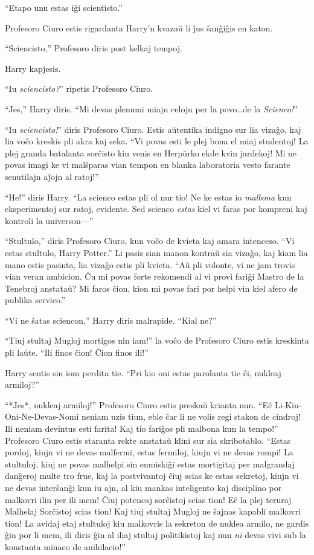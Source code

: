 ``Etapo unu estas iĝi scientisto.''

Profesoro Ciuro estis rigardanta Harry'n kvazaŭ li ĵus ŝanĝiĝis en katon.

``Sciencisto,'' Profesoro diris post kelkaj tempoj.

Harry kapjesis.

``Iu \emph{sciencisto?}'' ripetis Profesoro Ciuro.

``Jes,'' Harry diris. ``Mi devas plenumi miajn celojn per la
povo\ldots de la \emph{Scienco!}''

``Iu \emph{sciencisto!}'' diris Profesoro Ciuro. Estis aŭtentika
indigno sur lia vizaĝo, kaj lia voĉo kreskis pli akra kaj seka. ``Vi
povas esti le plej bona el miaj studentoj! La plej granda batalanta
sorĉisto kiu venis en Herpŭrko ekde kvin jardekoj! Mi ne povas imagi
ke vi malŝparas vian tempon en blanka laboratoria vesto farante
senutilajn aĵojn al ratoj!''

``He!'' diris Harry. ``La scienco estas pli ol nur tio! Ne ke estas io
\emph{malbona} kun eksperimentoj sur ratoj, evidente. Sed scienco
\emph{estas} kiel vi faras por kompreni kaj kontroli la universon—''

``Stultulo,'' diris Profesoro Ciuro, kun voĉo de kvieta kaj amara
intenceso. ``Vi estas stultulo, Harry Potter.'' Li pasis sian manon
kontraŭ sia vizaĝo, kaj kiam lia mano estis pasinta, lia vizaĝo estis
pli kvieta. ``Aŭ pli volonte, vi ne jam trovis vian veran ambicion. Ĉu
mi povas forte rekomendi al vi provi fariĝi Mastro de la Tenebroj
anstataŭ? Mi faros ĉion, kion mi povas fari por helpi vin kiel afero
de publika servico.''

``Vi ne ŝatas sciencon,'' Harry diris malrapide. ``Kial ne?''

``Tiuj stultaj Mugloj mortigos nin iam!'' la voĉo de Profesoro Ciuro
estis kreskinta pli laŭte. ``Ili finos ĉion! Ĉion finos ili!''

Harry sentis sin iom perdita tie. ``Pri kio oni estas parolanta tie ĉi, nukleaj armiloj?''

``*Jes*, nukleaj armiloj!'' Profesoro Ciuro estis preskaŭ krianta
nun. ``Eĉ Li-Kiu-Oni-Ne-Devas-Nomi neniam uzis tiun, eble ĉar li ne
volis regi stakon de cindroj! Ili neniam devintus esti farita! Kaj tio
fariĝos pli malbona kun la tempo!'' Profesoro Ciuro estis staranta
rekte anstataŭ klini sur sia skribotablo. ``Estas pordoj, kiujn vi ne
devas malfermi, estas fermiloj, kiujn vi ne devas rompi! La stultuloj,
kiuj ne povas malhelpi sin enmiskiĝi estas mortigitaj per malgrandaj
danĝeroj multe tro frue, kaj la postvivantoj ĉiuj scias ke estas
sekretoj, kiujn vi ne devas interŝanĝi kun iu ajn, al kiu mankas
inteligento kaj disciplino por malkovri ilin per ili mem! Ĉiuj
potencaj sorĉistoj scias tion! Eĉ la plej teruraj Malhelaj Sorĉistoj
scias tion!  Kaj tiuj stultaj Mugloj ne ŝajnas kapabli malkovri tion!
La avidaj etaj stultuloj kiu malkovris la sekreton de nuklea armilo,
ne gardis ĝin por li mem, ili diris ĝin al iliaj stultaj politikistoj
kaj nun \emph{ni} devas vivi sub la konstanta minaco de anihilacio!''

